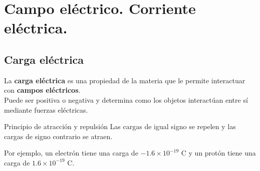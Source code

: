 \section{Campo eléctrico. Corriente eléctrica.}
\subsection{Carga eléctrica}
La \textbf{carga eléctrica} es una propiedad de la materia que le permite interactuar con \textbf{campos eléctricos}.\\ Puede ser positiva o negativa y determina como los objetos interactúan entre sí mediante fuerzas eléctricas.

\begin{teorema}{Principio de atracción y repulsión}
    Las cargas de igual signo se repelen y las cargas de signo contrario se atraen.
\end{teorema}
Por ejemplo, un electrón tiene una carga de $-1.6 \times 10^{-19}$ C y un protón tiene una carga de $1.6 \times 10^{-19}$ C.

\centering
\def\a{2.5}
\def\R{0.33}

